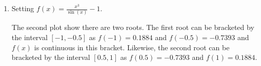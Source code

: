 \documentclass[a4paper,11pt]{article}
\begin{document}
\begin{enumerate}
\begin{enumerate}
			
		\item Setting $f(x) = \frac{x^{3}}{\sin(x)} - 1$.
			
		The second plot show there are two roots. The first root can be 
		bracketed by the interval $[-1,-0.5]$ as $f(-1) = 0.1884$ 
		and 
		$f(-0.5)=-0.7393$ and $f(x)$ is continuous in this bracket. Likewise, 
		the second root can be bracketed by the interval $[0.5,1]$ as 
		$f(0.5)=-0.7393$ and 
		$f(1)=0.1884$.
		

\end{enumerate}
\end{enumerate}
\end{document}
